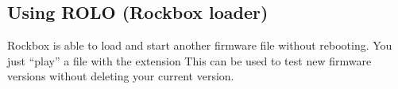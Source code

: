 \subsection{\label{ref:using_rolo}Using ROLO (Rockbox loader)}
Rockbox is able to load and start another firmware file without rebooting. 
You just ``play'' a file with the extension %
This can be used to test new firmware versions without deleting your
current version.


